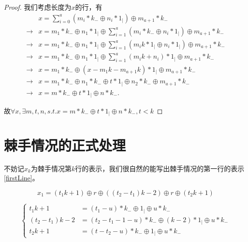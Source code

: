 \begin{proof}
    我们考虑长度为$x$的行，有
    $$
        \begin{aligned}
                        & x = \sum_{i=0}^{a} (m_i * k_{-} \oplus n_i * 1_{\vert}) \oplus m_{a+1} * k_{-}                                                \\
            \rightarrow & x = m_1 * k_{-} \oplus n_1 * 1_{\vert} \oplus \sum_{i=1}^{a} (m_i * k_{-} \oplus n_i * 1_{\vert})\oplus m_{a+1} * k_{-}       \\
            \rightarrow & x = m_1 * k_{-} \oplus n_1 * 1_{\vert} \oplus \sum_{i=1}^{a} (m_ik * 1_{\vert} \oplus n_i * 1_{\vert}) \oplus m_{a+1} * k_{-} \\
            \rightarrow & x = m_1 * k_{-} \oplus n_1 * 1_{\vert} \oplus \sum_{i=1}^{a} (m_ik + n_i) * 1_{\vert} \oplus m_{a+1} * k_{-}                  \\
            \rightarrow & x = m_1 * k_{-} \oplus (x - m_1k - m_{a+1}k) * 1_{\vert} \oplus m_{a+1} * k_{-}                                               \\
            \rightarrow & x = m_1 * k_{-} \oplus n_1 * k_{-} \oplus t * 1_{\vert} \oplus n_2 * k_{-} \oplus m_{a+1} * k_{-}                             \\
            \rightarrow & x = m * k_{-} \oplus t * 1_{\vert} \oplus n * k_{-}.
        \end{aligned}
    $$

    故$\forall x, \exists m, t, n, s.t. x = m * k_{-} \oplus t * 1_{\vert} \oplus n * k_{-}, t < k$
\end{proof}

\section{棘手情况的正式处理}

不妨记$x_k$为棘手情况第$k$行的表示，我们很自然的能写出棘手情况的第一行的表示\ref{firstLine}。

\begin{equation}
    x_1 = (t_1k + 1) \oplus r \oplus ((t_2 - t_1)k - 2) \oplus r \oplus  (t_2k + 1)
    \label{firstLine}
\end{equation}

\begin{equation}
    \left\{
    \begin{aligned}
        t_1k + 1         & = (t_1 - u) * k_{-}  \oplus 1_{\vert} \oplus u * k_{-}                     \\
        (t_2 - t_1)k - 2 & = (t_2 - t_1 - 1 - u) * k_{-}  \oplus (k - 2) * 1_{\vert} \oplus u * k_{-} \\
        t_2k + 1         & = (t - t_2 - u) * k_{-}  \oplus 1_{\vert} \oplus u * k_{-}
    \end{aligned}
    \right.
    \label{first-difficult-sep}
\end{equation}

